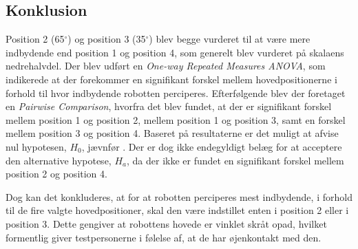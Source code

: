 \subsection*{Konklusion}
\label{Konklusion}
%
Position 2 (65$^{\circ}$) og position 3 (35$^{\circ}$) blev begge vurderet til at være mere indbydende end position 1 og position 4, som generelt blev vurderet på skalaens nedrehalvdel. Der blev udført en \textit{One-way Repeated Measures ANOVA}, som indikerede at der forekommer en signifikant forskel mellem hovedpositionerne i forhold til hvor indbydende robotten perciperes. Efterfølgende blev der foretaget en \textit{Pairwise Comparison}, hvorfra det blev fundet, at der er signifikant forskel mellem position 1 og position 2, mellem position 1 og position 3, samt en forskel mellem position 3 og position 4. Baseret på resultaterne er det muligt at afvise nul hypotesen, $H_0$, jævnfør . Der er dog ikke endegyldigt belæg for at acceptere den alternative hypotese, $H_a$, da der ikke er fundet en signifikant forskel mellem position 2 og position 4. 

Dog kan det konkluderes, at for at robotten perciperes mest indbydende, i forhold til de fire valgte hovedpositioner, skal den være indstillet enten i position 2 eller i position 3. Dette gengiver at robottens hovede er vinklet skråt opad, hvilket formentlig giver testpersonerne i følelse af, at de har øjenkontakt med den.       

